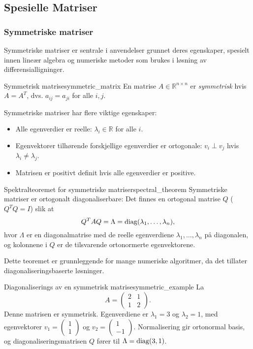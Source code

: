 \subsection{Spesielle Matriser}
\subsubsection{Symmetriske matriser}
Symmetriske matriser er sentrale i anvendelser grunnet deres egenskaper, spesielt innen lineær algebra og numeriske metoder som brukes i løsning av differensialligninger.

\begin{definition}{Symmetrisk matrise}{symmetric_matrix}
	En matrise $A \in \mathbb{R}^{n \times n}$ er \emph{symmetrisk} hvis $A = A^T$, dvs. $a_{ij} = a_{ji}$ for alle $i,j$.
\end{definition}

Symmetriske matriser har flere viktige egenskaper:
\begin{itemize}
	\item Alle egenverdier er reelle: $\lambda_i \in \mathbb{R}$ for alle $i$.
	\item Egenvektorer tilhørende forskjellige egenverdier er ortogonale: $v_i \perp v_j$ hvis $\lambda_i \neq \lambda_j$.
	\item Matrisen er positivt definit hvis alle egenverdier er positive.
\end{itemize}

\begin{theorem}{Spektralteoremet for symmetriske matriser}{spectral_theorem}
	Symmetriske matriser er ortogonalt diagonaliserbare: Det finnes en ortogonal matrise $Q$ ($Q^T Q = I$) slik at
	\[
		Q^T A Q = \Lambda = \operatorname{diag}(\lambda_1, \dots, \lambda_n),
	\]
	hvor $\Lambda$ er en diagonalmatrise med de reelle egenverdiene $\lambda_1, \dots, \lambda_n$ på diagonalen, og kolonnene i $Q$ er de tilsvarende ortonormerte egenvektorene.
\end{theorem}

Dette teoremet er grunnleggende for mange numeriske algoritmer, da det tillater diagonaliseringsbaserte løsninger.

\begin{example}{Diagonaliserings av en symmetrisk matrise}{symmetric_example}
	La
	\[
		A = \begin{pmatrix} 2 & 1 \\ 1 & 2 \end{pmatrix}.
	\]
	Denne matrisen er symmetrisk. Egenverdiene er $\lambda_1 = 3$ og $\lambda_2 = 1$, med egenvektorer $v_1 = \begin{pmatrix} 1 \\ 1 \end{pmatrix}$ og $v_2 = \begin{pmatrix} 1 \\ -1 \end{pmatrix}$. Normalisering gir ortonormal basis, og diagonaliseringsmatrisen $Q$ fører til $\Lambda = \operatorname{diag}(3, 1)$.
\end{example}

